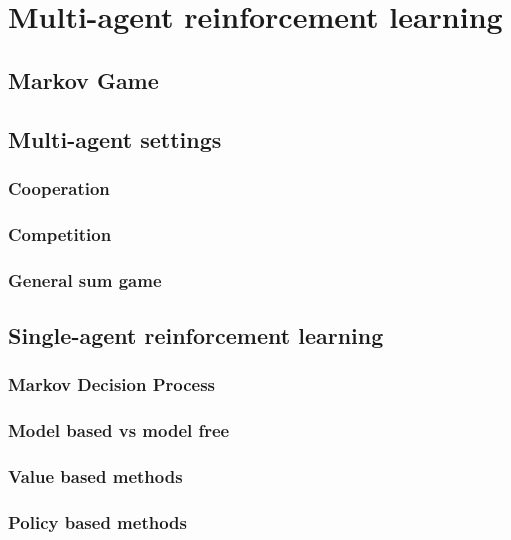 \chapter{Multi-agent reinforcement learning}\label{ch:marl}

\section{Markov Game}
\section{Multi-agent settings}
\subsection{Cooperation}
\subsection{Competition}
\subsection{General sum game}
\section{Single-agent reinforcement learning}
\subsection{Markov Decision Process}
\subsection{Model based vs model free}
\subsection{Value based methods}
\subsection{Policy based methods}